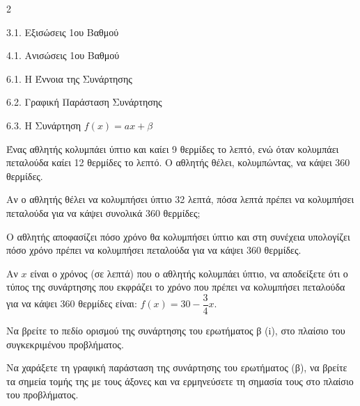 \begin{ylh}{2}
    \item 3.1. Εξισώσεις 1ου Βαθμού
    \item 4.1. Ανισώσεις 1ου Βαθμού
    \item 6.1. Η Έννοια της Συνάρτησης
    \item 6.2. Γραφική Παράσταση Συνάρτησης
    \item 6.3. Η Συνάρτηση $f(x)=ax+\beta$
\end{ylh}
Ένας αθλητής κολυμπάει ύπτιο και καίει 9 θερμίδες το λεπτό, ενώ όταν κολυμπάει πεταλούδα καίει 12 θερμίδες το λεπτό. Ο αθλητής θέλει, κολυμπώντας, να κάψει 360 θερμίδες.

\begin{alist}
\item Αν ο αθλητής θέλει να κολυμπήσει ύπτιο 32 λεπτά, πόσα λεπτά πρέπει να κολυμπήσει πεταλούδα για να κάψει συνολικά 360 θερμίδες;

\item Ο αθλητής αποφασίζει πόσο χρόνο θα κολυμπήσει ύπτιο και στη συνέχεια υπολογίζει πόσο χρόνο πρέπει να κολυμπήσει πεταλούδα για να κάψει 360 θερμίδες.
\begin{rlist}
\item
  Αν $x$ είναι ο χρόνος (σε λεπτά) που ο αθλητής κολυμπάει ύπτιο, να αποδείξετε ότι ο τύπος της συνάρτησης που εκφράζει το χρόνο που πρέπει να κολυμπήσει πεταλούδα για να κάψει 360 θερμίδες είναι: $f(x) = 30 - \dfrac{3}{4}x$.
\item
  Να βρείτε το πεδίο ορισμού της συνάρτησης του ερωτήματος β (i), στο πλαίσιο του συγκεκριμένου προβλήματος.
\end{rlist}
\item Να χαράξετε τη γραφική παράσταση της συνάρτησης του ερωτήματος (β), να βρείτε τα σημεία τομής της με τους άξονες και να ερμηνεύσετε τη σημασία τους στο πλαίσιο του προβλήματος.
\end{alist}

